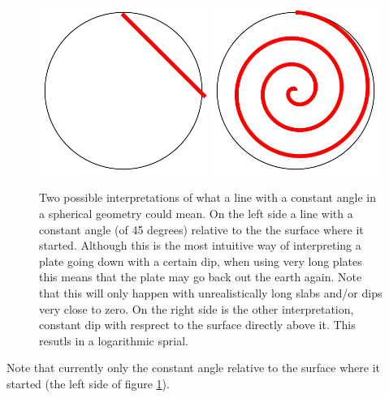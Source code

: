 \documentclass{book}
\begin{document}
\begin{figure}
    \centering
    \includegraphics[width=0.49\textwidth]{spherical_approximations_line}
    \includegraphics[width=0.49\textwidth]{spherical_approximations_spiral}
    \caption{Two possible interpretations of what a line with a constant angle in a spherical geometry could mean. On the left side a line with a constant angle (of 45 degrees) relative to the the surface where it started. Although this is the most intuitive way of interpreting a plate going down with a certain dip, when using very long plates this means that the plate may go back out the earth again. Note that this will only happen with unrealistically long slabs and/or dips very close to zero. On the right side is the other interpretation, constant dip with resprect to the surface directly above it. This resutls in a logarithmic sprial.}
    \label{fig:coordinate_systems_line_spiral}
\end{figure}

\begin{remark}
Note that currently only the constant angle relative to the surface where it started (the left side of figure \ref{fig:coordinate_systems_line_spiral}).
\end{remark}
\end{document}
